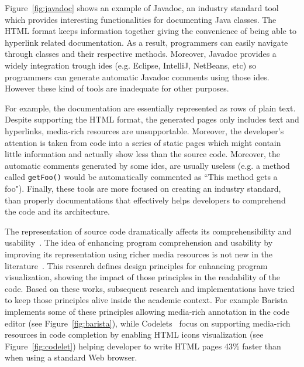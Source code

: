 Figure~\ref{fig:javadoc} shows an example of Javadoc, an industry standard tool which provides interesting functionalities for documenting Java classes. The HTML format keeps information together giving the convenience of being able to hyperlink related documentation. As a result, programmers can easily navigate through classes and their respective methods. Moreover, Javadoc provides a widely integration trough \glspl{ide} (e.g. Eclipse, IntelliJ, NetBeans, etc) so programmers can generate automatic Javadoc comments using those \glspl{ide}. However these kind of tools are inadequate for other purposes.

For example, the documentation are essentially represented as rows of plain text. Despite supporting the HTML format, the generated pages only includes text and hyperlinks, media-rich resources are unsupportable. Moreover, the developer's attention is taken from code into a series of static pages which might contain little information and actually show less than the source code. Moreover, the automatic comments generated by some \glspl{ide}, are usually useless (e.g. a method called \texttt{getFoo()} would be automatically commented as ``This method gets a foo"). Finally, these tools are more focused on creating an industry standard, than properly documentations that effectively helps developers to comprehend the code and its architecture.

The representation of source code dramatically affects its comprehensibility and usability~\citep{baecker1986design}. The idea of enhancing program comprehension and usability by improving its representation using richer media resources is not new in the literature~\citep{marcus1982graphic,baecker1986design,baecker1983enhancing}. This research defines design principles for enhancing program visualization, showing the impact of those principles in the readability of the code. Based on these works, subsequent research and implementations have tried to keep those principles alive inside the academic context. For example Barista~\citep{ko2006barista} implements some of these principles  allowing media-rich annotation in the code editor (see Figure~\ref{fig:barista}), while Codelets~\citep{oney2012codelets} focus on supporting media-rich resources in code completion by enabling HTML icons visualization (see Figure~\ref{fig:codelet}) helping developer to write HTML pages 43\% faster than when using a standard Web browser\citep{oney2012codelets}.

